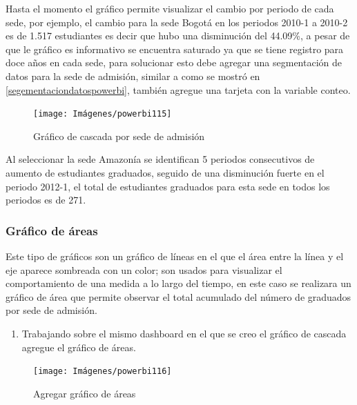 \documentclass[
]{book}
\providecommand{\tightlist}{%
  \setlength{\itemsep}{0pt}\setlength{\parskip}{0pt}}
\begin{document}
Hasta el momento el gráfico permite visualizar el cambio por periodo de cada sede, por ejemplo, el cambio para la sede Bogotá en los periodos 2010-1 a 2010-2 es de 1.517 estudiantes es decir que hubo una disminución del 44.09\%, a pesar de que le gráfico es informativo se encuentra saturado ya que se tiene registro para doce años en cada sede, para solucionar esto debe agregar una segmentación de datos para la sede de admisión, similar a como se mostró en \ref{segementaciondatospowerbi}, también agregue una tarjeta con la variable conteo.

\begin{figure}

{\centering \texttt{[image: Imágenes/powerbi115]} 

}

\caption{Gráfico de cascada por sede de admisión}\label{fig:graficocascada-fig}
\end{figure}

Al seleccionar la sede Amazonía se identifican 5 periodos consecutivos de aumento de estudiantes graduados, seguido de una disminución fuerte en el periodo 2012-1, el total de estudiantes graduados para esta sede en todos los periodos es de 271.

\hypertarget{graficodeareaspowerbi}{%
\subsubsection{Gráfico de áreas}\label{graficodeareaspowerbi}}

Este tipo de gráficos son un gráfico de líneas en el que el área entre la línea y el eje aparece sombreada con un color; son usados para visualizar el comportamiento de una medida a lo largo del tiempo, en este caso se realizara un gráfico de área que permite observar el total acumulado del número de graduados por sede de admisión.

\begin{enumerate}
\def\labelenumi{\arabic{enumi}.}
\tightlist
\item
  Trabajando sobre el mismo dashboard en el que se creo el gráfico de cascada agregue el gráfico de áreas.
\end{enumerate}

\begin{figure}

{\centering \texttt{[image: Imágenes/powerbi116]} 

}

\caption{Agregar gráfico de áreas}\label{fig:paso1graficoareas-fig}
\end{figure}
\end{document}
